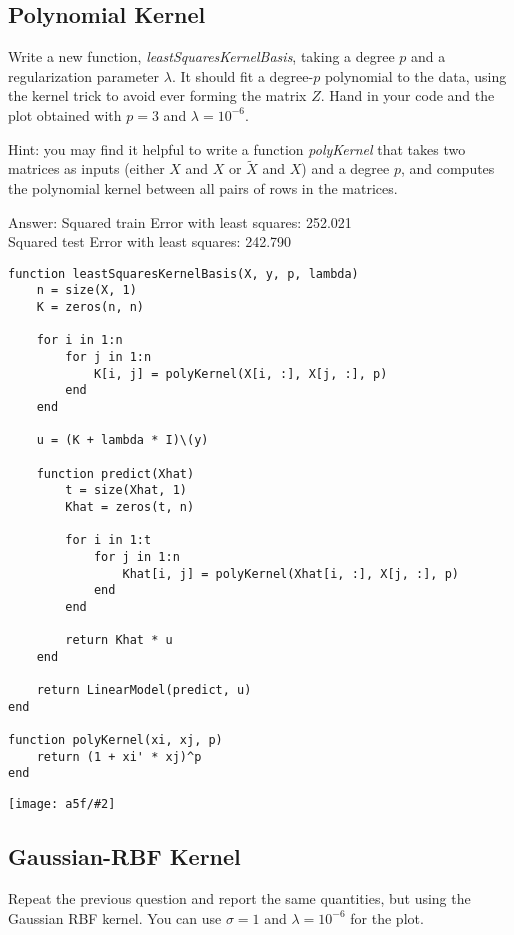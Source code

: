 \documentclass{article}
\def\ans#1{\par\gre{Answer: #1}}
\def\blu#1{{\color{blu}#1}}
\def\gre#1{{\color{gre}#1}}
\newcommand{\fig}[2]{\texttt{[image: a5f/\#2]}}
\begin{document}
\pagebreak
\subsection{Polynomial Kernel}

Write a new function, \emph{leastSquaresKernelBasis}, taking a degree $p$ and a regularization parameter $\lambda$. It should fit a degree-$p$ polynomial to the data, using the kernel trick to avoid ever forming the matrix $Z$. \blu{Hand in your code and the plot obtained with $p=3$ and $\lambda =10^{-6}$.}

Hint: you may find it helpful to write a function \emph{polyKernel} that takes two matrices as inputs (either $X$ and $X$ or $\tilde{X}$ and $X$) and a degree $p$, and computes the polynomial kernel between all pairs of rows in the matrices.

\ans{Squared train Error with least squares: 252.021\\
Squared test Error with least squares: 242.790}
\begin{lstlisting}
function leastSquaresKernelBasis(X, y, p, lambda)
	n = size(X, 1)
	K = zeros(n, n)

	for i in 1:n
		for j in 1:n
			K[i, j] = polyKernel(X[i, :], X[j, :], p)
		end
	end

	u = (K + lambda * I)\(y)

	function predict(Xhat)
		t = size(Xhat, 1)
		Khat = zeros(t, n)

		for i in 1:t
			for j in 1:n
				Khat[i, j] = polyKernel(Xhat[i, :], X[j, :], p)
			end
		end

		return Khat * u
	end

	return LinearModel(predict, u)
end

function polyKernel(xi, xj, p)
	return (1 + xi' * xj)^p
end
\end{lstlisting}
\fig{1}{Q1.2}


\pagebreak
\subsection{Gaussian-RBF Kernel}

\blu{Repeat the previous question and report the same quantities, but using the Gaussian RBF kernel.} You can use $\sigma=1$ and $\lambda=10^{-6}$ for the plot.
\end{document}
